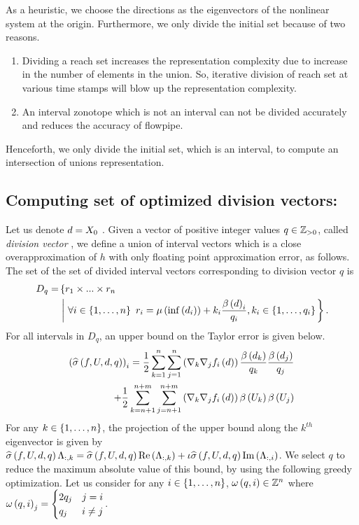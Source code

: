 As a heuristic, we choose the directions as the eigenvectors of the
nonlinear system at the origin.  Furthermore, we only divide the initial set
because of two reasons.
%
\begin{enumerate}
\item Dividing a reach set increases the representation complexity due to
increase in the number of elements in the union.  So, iterative
division of reach set at various time stamps will blow up the
representation complexity.
\item  An interval zonotope which is not an interval can not
be divided accurately and reduces the accuracy of flowpipe.
\end{enumerate}
%
Henceforth, we only divide the initial set, which is an interval, to
compute an intersection of unions representation.
%
\subsection{Computing set of optimized division vectors:}
Let us denote $d=X_0$ .  Given a vector of positive integer
values $q\in\mathbb{Z}_{>0}$, called \emph{division vector} , we define
a union of interval vectors which is a close overapproximation of $h$
with only floating point approximation error, as follows.  The set of
the set of divided interval vectors corresponding to division vector
$q$ is
%
\begin{align*}
D_q
= & \left\{r_1\times...\times r_n\right.\\
& \left.\left|~\forall i\in\left\{1,\ldots,n\right\}~r_i
= \mu\left(\inf\left(d_i\right)\right)+k_i\frac{\beta\left(d\right)_i}{q_i}, k_i\in\left\{1,\ldots,q_i\right\}\right.\right\}.
\end{align*}
%
For all intervals in $D_q$, an upper bound on the Taylor error is
given below.
%
\begin{align*}
\left(\widehat{\sigma}\left(f,U,d,q\right)\right)_i
= \frac{1}{2}\sum_{k=1}^{n}\sum_{j=1}^{n}\left(\nabla_k\nabla_j{f_i}\left(d\right)\right)\frac{\beta\left(d_k\right)}{q_k}\frac{\beta\left(d_j\right)}{q_j}
\\
+ \frac{1}{2}\sum_{k=n+1}^{n+m}\sum_{j=n+1}^{n+m}\left(\nabla_k\nabla_j{f_i}\left(d\right)\right)\beta\left(U_k\right)\beta\left(U_j\right)
\end{align*}
%
For any $k\in\left\{1,\ldots,n\right\}$, the projection of the upper bound
along the $k^{th}$ eigenvector is given by
$\widehat{\sigma}\left(f,U,d,q\right)\Lambda_{:,k}
= \widehat{\sigma}\left(f,U,d,q\right)\operatorname{Re}\left(\Lambda_{:,k}\right)
+ \iota\widehat{\sigma}\left(f,U,d,q\right)\operatorname{Im}\left(\Lambda_{:,i}\right)$.  We select $q$ to
reduce the maximum absolute value of this bound, by using the
following greedy optimization.  Let us consider for any
$i\in\left\{1,\ldots,n\right\}$, $\omega\left(q,i\right)\in\mathbb{Z}^n$ where $\omega\left(q,i\right)_j
= \begin{cases}2q_j & j=i\\ q_j & i\neq j \end{cases}$.


